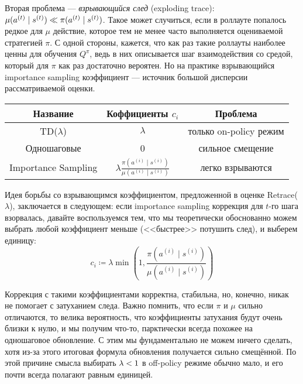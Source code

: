 Вторая проблема --- \emph{взрывающийся след} (exploding trace): $\mu(a^{(t)} \mid s^{(t)}) \HM\ll \pi(a^{(t)} \mid s^{(t)})$. Такое может случиться, если в роллауте попалось редкое для $\mu$ действие, которое тем не менее часто выполняется оцениваемой стратегией $\pi$. С одной стороны, кажется, что как раз такие роллауты наиболее ценны для обучения $Q^\pi$, ведь в них описывается шаг взаимодействия со средой, который для $\pi$ как раз достаточно вероятен. Но на практике взрывающийся importance sampling коэффициент --- источник большой дисперсии рассматриваемой оценки.

\begin{center}
\begin{tabular}{|c|c|c|}
\hline
\textbf{Название} & \textbf{Коффициенты $c_i$} & \textbf{Проблема}\\
\hline
TD($\lambda$) & $\lambda$ &
только on-policy режим \\
\hline
Одношаговые & 0 &
сильное смещение \\
\hline
Importance Sampling & $\lambda \frac{\pi(a^{(i)} \mid s^{(i)}) }{\mu(a^{(i)} \mid s^{(i)})}$ &
легко взрываются \\
\hline
\end{tabular}
\end{center}

Идея борьбы со взрывающимся коэффициентом, предложенной в оценке Retrace($\lambda$), заключается в следующем: если importance sampling коррекция для $t$-го шага взорвалась, давайте воспользуемся тем, что мы теоретически обоснованно можем выбрать любой коэффициент меньше (<<быстрее>> потушить след), и выберем единицу:
\begin{equation}\label{retracecoeff}
c_i \coloneqq \lambda \min \left( 1, \frac{\pi(a^{(i)} \mid s^{(i)}) }{\mu(a^{(i)} \mid s^{(i)})} \right) 
\end{equation}

Коррекция с такими коэффициентами корректна, стабильна, но, конечно, никак не помогает с затуханием следа. Важно помнить, что если $\pi$ и $\mu$ сильно отличаются, то велика вероятность, что коэффициенты затухания будут очень близки к нулю, и мы получим что-то, парктически всегда похожее на одношаговое обновление. С этим мы фундаментально не можем ничего сделать, хотя из-за этого итоговая формула обновления получается сильно смещённой. По этой причине смысла выбирать $\lambda \HM< 1$ в off-policy режиме обычно мало, и его почти всегда полагают равным единицей.

